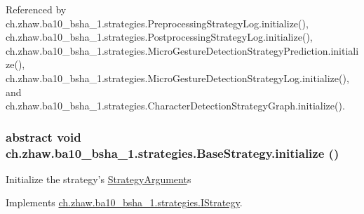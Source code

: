 Referenced by ch.zhaw.ba10\_\-bsha\_\-1.strategies.PreprocessingStrategyLog.initialize(), ch.zhaw.ba10\_\-bsha\_\-1.strategies.PostprocessingStrategyLog.initialize(), ch.zhaw.ba10\_\-bsha\_\-1.strategies.MicroGestureDetectionStrategyPrediction.initialize(), ch.zhaw.ba10\_\-bsha\_\-1.strategies.MicroGestureDetectionStrategyLog.initialize(), and ch.zhaw.ba10\_\-bsha\_\-1.strategies.CharacterDetectionStrategyGraph.initialize().\hypertarget{classch_1_1zhaw_1_1ba10__bsha__1_1_1strategies_1_1BaseStrategy_af6ea27835befac71906915236a347450}{
\subsubsection[{initialize}]{\setlength{\rightskip}{0pt plus 5cm}abstract void ch.zhaw.ba10\_\-bsha\_\-1.strategies.BaseStrategy.initialize ()}}
\label{classch_1_1zhaw_1_1ba10__bsha__1_1_1strategies_1_1BaseStrategy_af6ea27835befac71906915236a347450}
Initialize the strategy's \hyperlink{classch_1_1zhaw_1_1ba10__bsha__1_1_1StrategyArgument}{StrategyArgument}s 

Implements \hyperlink{interfacech_1_1zhaw_1_1ba10__bsha__1_1_1strategies_1_1IStrategy_afb7e5e1e93cea653f1754dbd60db4ec8}{ch.zhaw.ba10\_\-bsha\_\-1.strategies.IStrategy}.

